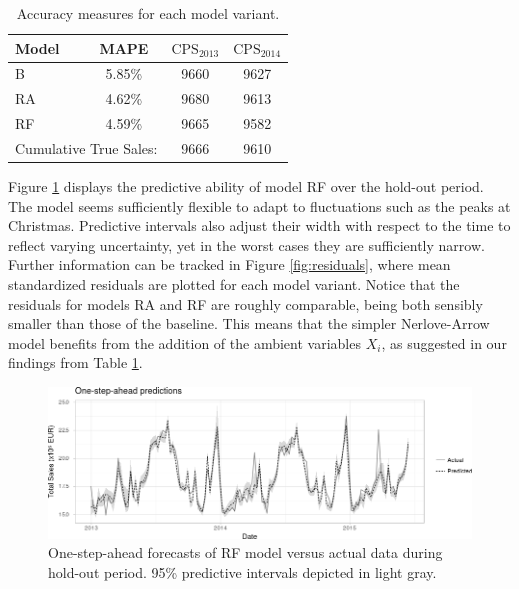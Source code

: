 \begin{table}[h]
\centering
\begin{tabular}{|l|c|c|c|}
\hline
Model & MAPE & $\text{CPS}_{2013}$ & $\text{CPS}_{2014}$ \\
\hline
B &  5.85\% &   9660 & 9627 \\
RA &  4.62\% &  9680 & 9613 \\
RF &  4.59\% &  9665 & 9582 \\
\hline
\multicolumn{2}{|c|}{Cumulative True Sales:} & 9666 & 9610 \\
\hline
\end{tabular}
\caption{Accuracy measures for each model variant.} \label{tab:mapes}
\end{table}



Figure \ref{fig:forecasts} displays the predictive ability of model RF over the hold-out period. The model seems sufficiently flexible to adapt to fluctuations such as the peaks at Christmas. Predictive intervals also adjust their width with respect to the time to reflect varying uncertainty, yet in the worst cases they are sufficiently narrow. Further information can be tracked in Figure \ref{fig:residuals}, where mean standardized residuals are plotted for each model variant. Notice that the residuals for models RA and RF are roughly comparable, being both sensibly smaller than those of the baseline. This means that the simpler Nerlove-Arrow model benefits from the addition of the ambient variables $X_i$, as suggested in our findings from Table \ref{tab:mapes}.
\begin{figure}[h]
\centering
\includegraphics[scale=0.55]{figures/forecasts.png}
\caption{One-step-ahead forecasts of  RF model versus actual data during hold-out period. 95\% predictive intervals depicted in light gray.}\label{fig:forecasts}
\end{figure}




